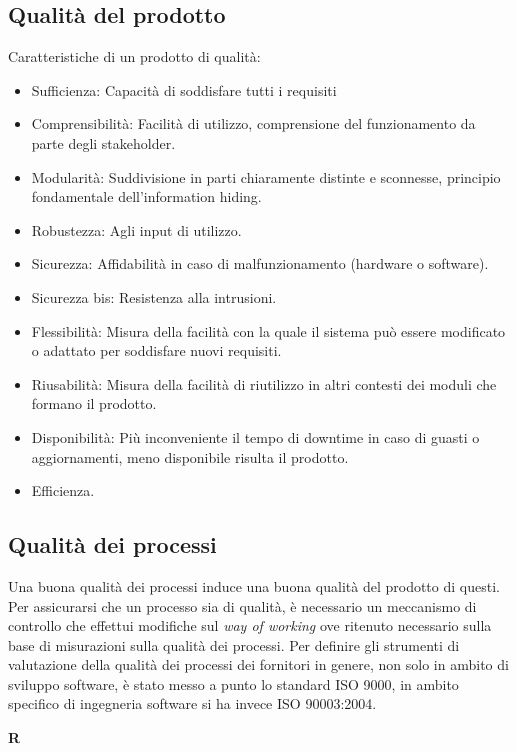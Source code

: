 	\subsection{Qualità del prodotto}
	Caratteristiche di un prodotto di qualità:
	\begin{itemize}  
	\item Sufficienza: Capacità di soddisfare tutti i requisiti
	\item Comprensibilità: Facilità di utilizzo, comprensione del funzionamento da parte degli stakeholder.
	\item Modularità: Suddivisione in parti chiaramente distinte e sconnesse, principio fondamentale dell'information hiding. 
	\item Robustezza: Agli input di utilizzo.
	\item Sicurezza: Affidabilità in caso di malfunzionamento (hardware o software).
	\item Sicurezza bis: Resistenza alla intrusioni. 
	\item Flessibilità: Misura della facilità con la quale il sistema può essere modificato o adattato per soddisfare nuovi requisiti.
	\item Riusabilità: Misura della facilità di riutilizzo in altri contesti dei moduli che formano il prodotto.
	\item Disponibilità: Più inconveniente il tempo di downtime in caso di guasti o aggiornamenti, meno disponibile risulta il prodotto.	
	\item Efficienza.
	\end{itemize}
	\subsection{Qualità dei processi}
	Una buona qualità dei processi induce una buona qualità del prodotto di questi. Per assicurarsi che un processo sia di qualità, è necessario un meccanismo di controllo che effettui modifiche sul \emph{way of working} ove ritenuto necessario sulla base di misurazioni sulla qualità dei processi. Per definire gli strumenti di valutazione della qualità dei processi dei fornitori in genere, non solo in ambito di sviluppo software, è stato messo a punto lo standard ISO 9000, in ambito specifico di ingegneria software si ha invece ISO 90003:2004.
	
		\newpage

	{\Huge{\textbf{R}}} \\
